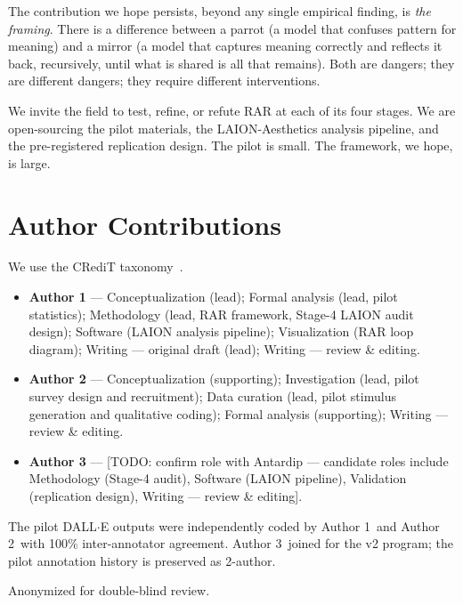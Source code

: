 \documentclass[sigconf,nonacm]{acmart}
\begin{document}
The contribution we hope persists, beyond any single empirical finding, is \emph{the framing}. There is a difference between a parrot (a model that confuses pattern for meaning) and a mirror (a model that captures meaning correctly and reflects it back, recursively, until what is shared is all that remains). Both are dangers; they are different dangers; they require different interventions.

We invite the field to test, refine, or refute RAR at each of its four stages. We are open-sourcing the pilot materials, the LAION-Aesthetics analysis pipeline, and the pre-registered replication design. The pilot is small. The framework, we hope, is large.

\section*{Author Contributions}

We use the CRediT taxonomy~\cite{credit2014}.

\begin{itemize}\itemsep0pt
  \item \textbf{Author 1} --- Conceptualization (lead); Formal analysis (lead, pilot statistics); Methodology (lead, RAR framework, Stage-4 LAION audit design); Software (LAION analysis pipeline); Visualization (RAR loop diagram); Writing --- original draft (lead); Writing --- review \& editing.
  \item \textbf{Author 2} --- Conceptualization (supporting); Investigation (lead, pilot survey design and recruitment); Data curation (lead, pilot stimulus generation and qualitative coding); Formal analysis (supporting); Writing --- review \& editing.
  \item \textbf{Author 3} --- [TODO: confirm role with Antardip --- candidate roles include Methodology (Stage-4 audit), Software (LAION pipeline), Validation (replication design), Writing --- review \& editing].
\end{itemize}

The pilot DALL$\cdot$E outputs were independently coded by Author 1\ and Author 2\ with 100\% inter-annotator agreement. Author 3\ joined for the v2 program; the pilot annotation history is preserved as 2-author.

\begin{acks}
Anonymized for double-blind review.
\end{acks}



\end{document}
